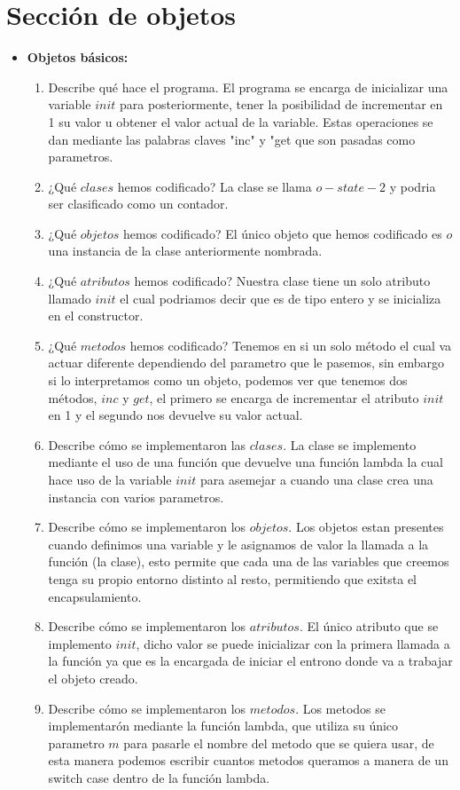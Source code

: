 \documentclass{article}
\begin{document}
\section{Sección de objetos}
\begin{itemize}
    \item \textbf{Objetos básicos:}
    \begin{enumerate}
        \item Describe qué hace el programa.
        El programa se encarga de inicializar una variable $init$ para posteriormente, tener la posibilidad de incrementar en 1 su valor u obtener el valor actual de la variable. Estas operaciones se dan mediante las palabras claves "inc" y "get que son pasadas como parametros.
        \item ¿Qué $clases$ hemos codificado?
        La clase se llama $o-state-2$ y podria ser clasificado como un contador.
        \item ¿Qué $objetos$ hemos codificado?
        El único objeto que hemos codificado es $o$ una instancia de la clase anteriormente nombrada.
        \item ¿Qué $atributos$ hemos codificado?
        Nuestra clase tiene un solo atributo llamado $init$ el cual podriamos decir que es de tipo entero y se inicializa en el constructor.
        \item ¿Qué $metodos$ hemos codificado?
        Tenemos en si un solo método el cual va actuar diferente dependiendo del parametro que le pasemos, sin embargo si lo interpretamos como un objeto, podemos ver que tenemos dos métodos, $inc$ y $get$, el primero se encarga de incrementar el atributo $init$ en 1 y el segundo nos devuelve su valor actual.
        \item Describe cómo se implementaron las $clases$.
        La clase se implemento mediante el uso de una función que devuelve una función lambda la cual hace uso de la variable $init$ para asemejar a cuando una clase crea una instancia con varios parametros.
        \item Describe cómo se implementaron los $objetos$.
        Los objetos estan presentes cuando definimos una variable y le asignamos de valor la llamada a la función (la clase), esto permite que cada una de las variables que creemos tenga su propio entorno distinto al resto, permitiendo que exitsta el encapsulamiento.
        \item Describe cómo se implementaron los $atributos$.
        El único atributo que se implemento $init$, dicho valor se puede inicializar con la primera llamada a la función ya que es la encargada de iniciar el entrono donde va a trabajar el objeto creado.
        \item Describe cómo se implementaron los $metodos$.
        Los metodos se implementarón mediante la función lambda, que utiliza su único parametro $m$ para pasarle el nombre del metodo que se quiera usar, de esta manera podemos escribir cuantos metodos queramos a manera de un switch case dentro de la función lambda.
    \end{enumerate}


\end{itemize}
\end{document}
